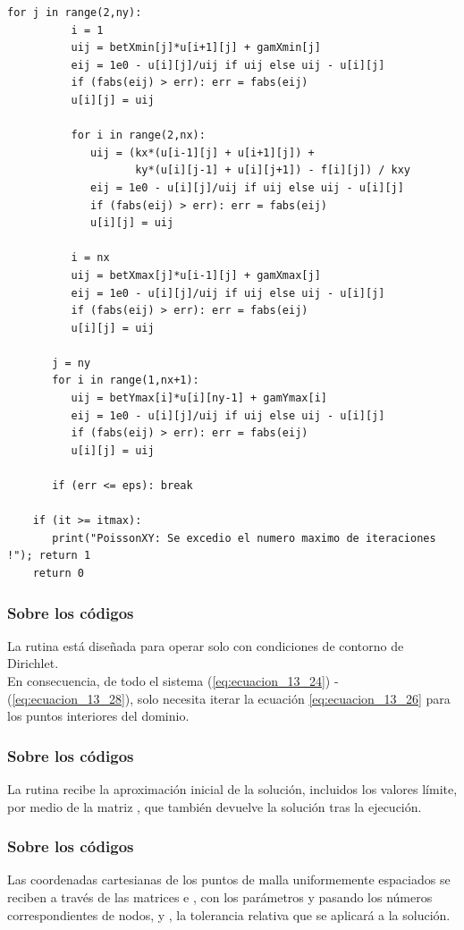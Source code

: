 \begin{frame}
\begin{lstlisting}[caption=Código para la función \texttt{PoissonXY}, style=FormattedNumber, basicstyle=\linespread{1.1}\ttfamily=\small, columns=fullflexible]
       for j in range(2,ny):
          i = 1
          uij = betXmin[j]*u[i+1][j] + gamXmin[j]
          eij = 1e0 - u[i][j]/uij if uij else uij - u[i][j]
          if (fabs(eij) > err): err = fabs(eij)
          u[i][j] = uij
 
          for i in range(2,nx):
             uij = (kx*(u[i-1][j] + u[i+1][j]) +
                    ky*(u[i][j-1] + u[i][j+1]) - f[i][j]) / kxy
             eij = 1e0 - u[i][j]/uij if uij else uij - u[i][j] 
             if (fabs(eij) > err): err = fabs(eij)
             u[i][j] = uij
 
          i = nx
          uij = betXmax[j]*u[i-1][j] + gamXmax[j]
          eij = 1e0 - u[i][j]/uij if uij else uij - u[i][j]
          if (fabs(eij) > err): err = fabs(eij)
          u[i][j] = uij
 
       j = ny
       for i in range(1,nx+1):
          uij = betYmax[i]*u[i][ny-1] + gamYmax[i]
          eij = 1e0 - u[i][j]/uij if uij else uij - u[i][j]
          if (fabs(eij) > err): err = fabs(eij)
          u[i][j] = uij
 
       if (err <= eps): break
 
    if (it >= itmax):
       print("PoissonXY: Se excedio el numero maximo de iteraciones !"); return 1
    return 0
\end{lstlisting}
\end{frame}
\begin{frame}
\frametitle{Sobre los códigos}
La rutina  está diseñada para operar solo con condiciones de contorno de Dirichlet.
\\
\bigskip
En consecuencia, de todo el sistema (\ref{eq:ecuacion_13_24}) - (\ref{eq:ecuacion_13_28}), solo necesita iterar la ecuación \ref{eq:ecuacion_13_26} para los puntos interiores del dominio.
\end{frame}
\begin{frame}
\frametitle{Sobre los códigos}
La rutina recibe la aproximación inicial de la solución, incluidos los valores límite, por medio de la matriz , que también devuelve la solución tras la ejecución.
\end{frame}
\begin{frame}
\frametitle{Sobre los códigos}
Las coordenadas cartesianas de los puntos de malla uniformemente espaciados se reciben a través de las matrices  e , con los parámetros  y  pasando los números correspondientes de nodos, y , la tolerancia relativa que se aplicará a la solución.
\end{frame}
